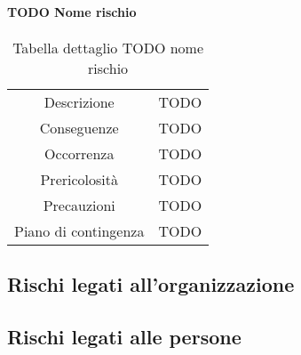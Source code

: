 \paragraph{TODO Nome rischio}
\renewcommand{\arraystretch}{1}
    \begin{table}[H]
        \begin{center}
            \setlength{\aboverulesep}{0pt}
            \setlength{\belowrulesep}{0pt}
            \setlength{\extrarowheight}{.75ex}
            \begin{tabular}{ c c }
                \rowcolor{AzzurroGruppo!30} 
                \toprule
                Descrizione & TODO \\
                Conseguenze & TODO \\
                Occorrenza & TODO \\
                Prericolosità & TODO \\
                Precauzioni & TODO \\
                Piano di contingenza & TODO \\
                \bottomrule
            \end{tabular}
            \caption{Tabella dettaglio TODO nome rischio}
        \end{center}
    \end{table}

\subsection{Rischi legati all’organizzazione}

\subsection{Rischi legati alle persone}